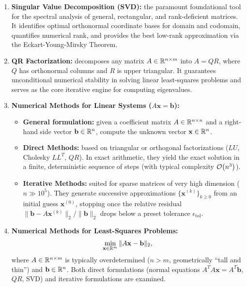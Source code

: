 \begin{enumerate}
    \item \textbf{Singular Value Decomposition (SVD):} the paramount foundational tool for the spectral analysis of general, rectangular, and rank-deficient matrices. It identifies optimal orthonormal coordinate bases for domain and codomain, quantifies numerical rank, and provides the best low-rank approximation via the Eckart-Young-Mirsky Theorem.

    \item \textbf{QR Factorization:} decomposes any matrix $A \in \mathbb{R}^{n \times m}$ into $A = QR$, where $Q$ has orthonormal columns and $R$ is upper triangular. It guarantees unconditional numerical stability in solving linear least-squares problems and serves as the core iterative engine for computing eigenvalues.

    \item \textbf{Numerical Methods for Linear Systems ($A\mathbf{x} = \mathbf{b}$):}
    \begin{itemize}
        \item \textbf{General formulation:} given a coefficient matrix $A \in \mathbb{R}^{n \times n}$ and a right-hand side vector $\mathbf{b} \in \mathbb{R}^n$, compute the unknown vector $\mathbf{x} \in \mathbb{R}^n$.
        \item \textbf{Direct Methods:} based on triangular or orthogonal factorizations ($LU$, Cholesky $LL^T$, $QR$). In exact arithmetic, they yield the exact solution in a finite, deterministic sequence of steps (with typical complexity $\mathcal{O}\!\left(n^3\right)$).
        \item \textbf{Iterative Methods:} suited for sparse matrices of very high dimension ($n \gg 10^5$). They generate successive approximations $\{\mathbf{x}^{(k)}\}_{k \ge 0}$ from an initial guess $\mathbf{x}^{(0)}$, stopping once the relative residual $\|\mathbf{b} - A\mathbf{x}^{(k)}\|_2 / \|\mathbf{b}\|_2$ drops below a preset tolerance $\epsilon_{\text{tol}}$.
    \end{itemize}

    \item \textbf{Numerical Methods for Least-Squares Problems:}
    \begin{equation}
        \min_{\mathbf{x} \in \mathbb{R}^m} \|A\mathbf{x} - \mathbf{b}\|_2,
    \end{equation}
    where $A \in \mathbb{R}^{n \times m}$ is typically overdetermined ($n > m$, geometrically ``tall and thin'') and $\mathbf{b} \in \mathbb{R}^n$. Both direct formulations (normal equations $A^T A \mathbf{x} = A^T \mathbf{b}$, $QR$, SVD) and iterative formulations are examined.


\end{enumerate}
